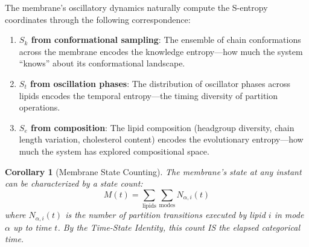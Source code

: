 \documentclass[twocolumn,10pt]{article}
\newtheorem{corollary}[theorem]{Corollary}
\theoremstyle{remark}
\newcommand{\Sk}{S_k}
\newcommand{\St}{S_t}
\newcommand{\Se}{S_e}
\begin{document}
The membrane's oscillatory dynamics naturally compute the S-entropy coordinates through the following correspondence:

\begin{enumerate}
    \item \textbf{$\Sk$ from conformational sampling}: The ensemble of chain conformations across the membrane encodes the knowledge entropy---how much the system ``knows'' about its conformational landscape.

    \item \textbf{$\St$ from oscillation phases}: The distribution of oscillator phases across lipids encodes the temporal entropy---the timing diversity of partition operations.

    \item \textbf{$\Se$ from composition}: The lipid composition (headgroup diversity, chain length variation, cholesterol content) encodes the evolutionary entropy---how much the system has explored compositional space.
\end{enumerate}

\begin{corollary}[Membrane State Counting]
The membrane's state at any instant can be characterized by a state count:
\begin{equation}
    M(t) = \sum_{\text{lipids}} \sum_{\text{modes}} N_{\alpha,i}(t)
\end{equation}
where $N_{\alpha,i}(t)$ is the number of partition transitions executed by lipid $i$ in mode $\alpha$ up to time $t$. By the Time-State Identity, this count IS the elapsed categorical time.
\end{corollary}
\end{document}
